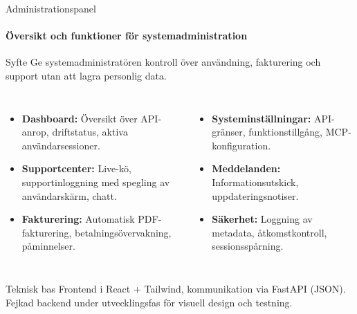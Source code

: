\documentclass[10pt]{beamer}
\begin{document}
\begin{frame}{Administrationspanel}
\framesubtitle{Översikt och funktioner för systemadministration}

\begin{block}{Syfte}
Ge systemadministratören kontroll över användning, fakturering och support utan att lagra personlig data.
\end{block}

\begin{columns}[T]
\begin{itemize}
  \item \textbf{Dashboard:} Översikt över API-anrop, driftstatus, aktiva användarsessioner.
  \item \textbf{Supportcenter:} Live-kö, supportinloggning med spegling av användarskärm, chatt.
  \item \textbf{Fakturering:} Automatisk PDF-fakturering, betalningsövervakning, påminnelser.
\end{itemize}

\begin{itemize}
  \item \textbf{Systeminställningar:} API-gränser, funktionstillgång, MCP-konfiguration.
  \item \textbf{Meddelanden:} Informationsutskick, uppdateringsnotiser.
  \item \textbf{Säkerhet:} Loggning av metadata, åtkomstkontroll, sessionsspårning.
\end{itemize}
\end{columns}

\begin{block}{Teknisk bas}
Frontend i React + Tailwind, kommunikation via FastAPI (JSON).  
Fejkad backend under utvecklingsfas för visuell design och testning.
\end{block}

\end{frame}
\end{document}
